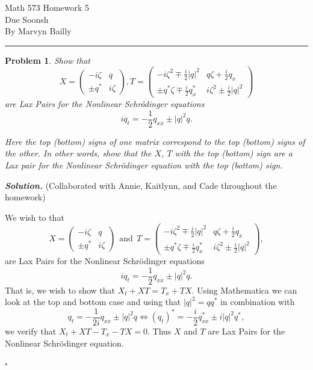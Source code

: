 \documentclass[12pt]{report}
\newtheorem{problem}{Problem}
\newenvironment{solution}[1][\it{Solution}]{\textbf{#1. } }{$\square$}
\begin{document}
\large

\begin{center}
 Math 573 Homework 5\\
 Due Soonsh\\
 By Marvyn Bailly\\
\end{center}

\normalsize

\hrule



\begin{problem}
    Show that
$$
X=\begin{pmatrix}
    -i\zeta & q\\ 
    \pm q^* & i\zeta
\end{pmatrix},
T=\begin{pmatrix}
    -i\zeta^2\mp\frac{i}{2}|q|^2&q\zeta+\frac{i}{2}q_x\\
    \pm q^*\zeta\mp \frac{i}{2}q^*_x&i\zeta^2\pm\frac{i}{2}|q|^2
\end{pmatrix}
$$
are Lax Pairs for the Nonlinear Schr\"odinger equations
$$
iq_t=-\frac{1}{2}q_{xx}\pm |q|^2 q.
$$

\noindent Here the top (bottom) signs of one matrix correspond to
the top (bottom) signs of the other. In other words, show that the
$X$, $T$ with the top (bottom) sign are a Lax pair for the Nonlinear
Schr\"odinger equation with the top (bottom) sign.
 
\end{problem}

\begin{solution}
    (Collaborated with Annie, Kaitlynn, and Cade throughout the homework)

    \noindent
    We wish to that 
    \[
        X=\begin{pmatrix}
            -i\zeta & q\\ 
            \pm q^* & i\zeta
        \end{pmatrix}
        ~~ \text{and} ~~
        T=\begin{pmatrix}
            -i\zeta^2\mp\frac{i}{2}|q|^2&q\zeta+\frac{i}{2}q_x\\
            \pm q^*\zeta\mp \frac{i}{2}q^*_x&i\zeta^2\pm\frac{i}{2}|q|^2
        \end{pmatrix},        
    \]
    are Lax Pairs for the Nonlinear Schr\"odinger equations
    \[ 
        iq_t=-\frac{1}{2}q_{xx}\pm |q|^2 q.
    \]
    That is, we wish to show that $X_t + XT = T_x + TX$. Using Mathematica we can look at the top and bottom case and using that $|q|^2 = qq^*$ in combination with 
    \[ 
        q_t = - \frac{1}{2i}q_{xx} \pm |q|^2q \iff (q_t)^* = -\frac{i}{2}q^*_{xx} \pm i |q|^2q^*,
    \] 
    we verify that $X_t + XT - T_x - TX = 0$. Thus $X$ and $T$ are Lax Pairs for the Nonlinear Schr\"odinger equation. 

\end{solution}
\end{document}
